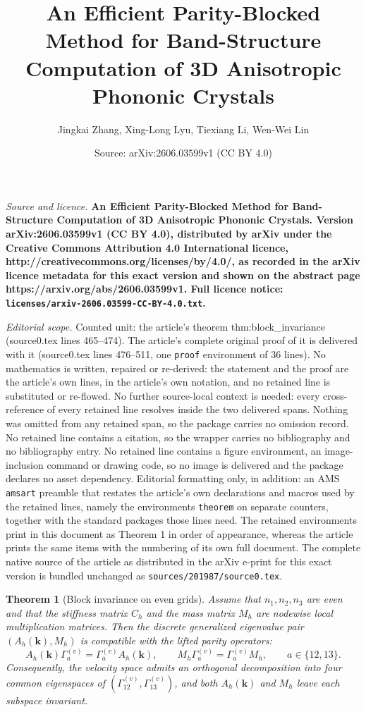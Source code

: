 \documentclass[10pt,a4paper]{amsart}
\title{\bfseries An Efficient Parity-Blocked Method for Band-Structure Computation of 3D Anisotropic Phononic Crystals}
\author{Jingkai Zhang, Xing-Long Lyu, Tiexiang Li, Wen-Wei Lin}
\date{Source: arXiv:2606.03599v1 (CC BY 4.0)}
\newtheorem{theorem}{Theorem}
\newcommand{\bk}{\bm{k}}
\begin{document}
\maketitle

\noindent\emph{Source and licence.} \bfseries An Efficient Parity-Blocked Method for Band-Structure Computation of 3D Anisotropic Phononic Crystals. Version arXiv:2606.03599v1 (CC BY 4.0), distributed by arXiv under the Creative Commons Attribution 4.0 International licence, http://creativecommons.org/licenses/by/4.0/, as recorded in the arXiv licence metadata for this exact version and shown on the abstract page https://arxiv.org/abs/2606.03599v1. Full licence notice: \texttt{licenses/arxiv-2606.03599-CC-BY-4.0.txt}.\par\smallskip

\noindent\textit{Editorial scope.} Counted unit: the article's theorem thm:block\_invariance (source0.tex lines 465--474). The article's complete original proof of it is delivered with it (source0.tex lines 476--511, one \texttt{proof} environment of 36 lines). No mathematics is written, repaired or re-derived: the statement and the proof are the article's own lines, in the article's own notation, and no retained line is substituted or re-flowed.  No further source-local context is needed: every cross-reference of every retained line resolves inside the two delivered spans.  Nothing was omitted from any retained span, so the package carries no omission record.  No retained line contains a citation, so the wrapper carries no bibliography and no bibliography entry.  No retained line contains a figure environment, an image-inclusion command or drawing code, so no image is delivered and the package declares no asset dependency.  Editorial formatting only, in addition: an AMS \texttt{amsart} preamble that restates the article's own declarations and macros used by the retained lines, namely the environments \texttt{theorem} on separate counters, together with the standard packages those lines need.  The retained environments print in this document as Theorem 1 in order of appearance, whereas the article prints the same items with the numbering of its own full document.  The complete native source of the article as distributed in the arXiv e-print for this exact version is bundled unchanged as \texttt{sources/201987/source0.tex}.
\begin{theorem}[Block invariance on even grids]\label{thm:block_invariance}
Assume that \(n_1,n_2,n_3\) are even and that the stiffness matrix \(C_h\) and the mass matrix \(M_h\) are nodewise local multiplication matrices. Then the discrete generalized eigenvalue pair \((A_h(\bk),M_h)\) is compatible with the lifted parity operators:
\begin{equation}\label{eq:A_M_commute_main}
A_h(\bk)\Gamma_a^{(v)}=\Gamma_a^{(v)}A_h(\bk),
\qquad
M_h\Gamma_a^{(v)}=\Gamma_a^{(v)}M_h,
\qquad a\in\{12,13\}.
\end{equation}
Consequently, the velocity space admits an orthogonal decomposition into four common eigenspaces of \((\Gamma_{12}^{(v)},\Gamma_{13}^{(v)})\), and both \(A_h(\bk)\) and \(M_h\) leave each subspace invariant.
\end{theorem}
\end{document}
